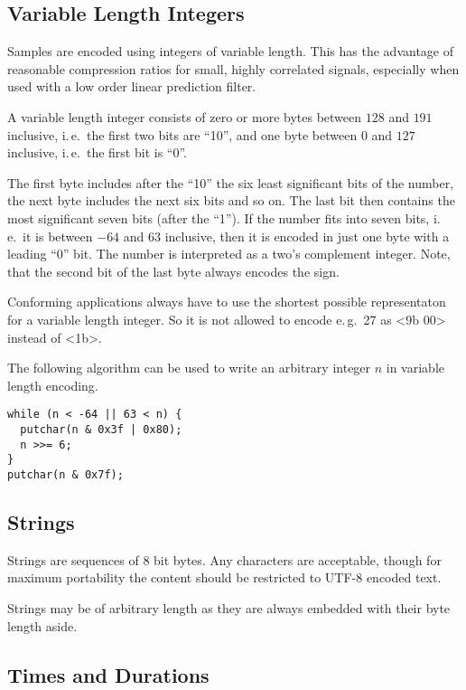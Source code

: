 \documentclass[DIV=10]{scrartcl}
\begin{document}
\subsection{Variable Length Integers}

Samples are encoded using integers of variable length.
This has the advantage of reasonable compression ratios for small, highly correlated signals, especially when used with a low order linear prediction filter.

A variable length integer consists of zero or more bytes between \(128\) and \(191\) inclusive, i.\,e.\ the first two bits are “10”, and one byte between \(0\) and \(127\) inclusive, i.\,e.\ the first bit is “0”.

The first byte includes after the “10” the six least significant bits of the number, the next byte includes the next six bits and so on.
The last bit then contains the most significant seven bits (after the “1”).
If the number fits into seven bits, i.\,e.\ it is between \(-64\) and \(63\) inclusive, then it is encoded in just one byte with a leading “0” bit.
The number is interpreted as a two’s complement integer.
Note, that the second bit of the last byte always encodes the sign.

Conforming applications always have to use the shortest possible representaton for a variable length integer.
So it is not allowed to encode e.\,g.\ 27 as <9b 00> instead of <1b>.

The following algorithm can be used to write an arbitrary integer \(n\) in variable length encoding.

\begin{verbatim}
while (n < -64 || 63 < n) {
  putchar(n & 0x3f | 0x80);
  n >>= 6;
}
putchar(n & 0x7f);
\end{verbatim}

\subsection{Strings}

Strings are sequences of 8 bit bytes.
Any characters are acceptable, though for maximum portability the content should be restricted to UTF-8 encoded text.

Strings may be of arbitrary length as they are always embedded with their byte length aside.

\subsection{Times and Durations}
\end{document}

